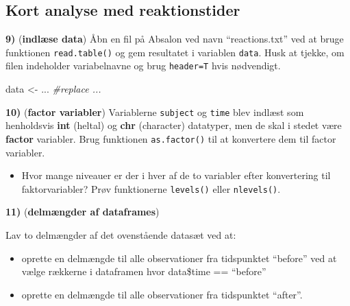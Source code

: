 \documentclass[
]{book}
\newenvironment{Shaded}{\begin{snugshade}}{\end{snugshade}}
\newcommand{\CommentTok}[1]{\textcolor[rgb]{0.56,0.35,0.01}{\textit{#1}}}
\newcommand{\DocumentationTok}[1]{\textcolor[rgb]{0.56,0.35,0.01}{\textbf{\textit{#1}}}}
\newcommand{\FunctionTok}[1]{\textcolor[rgb]{0.13,0.29,0.53}{\textbf{#1}}}
\newcommand{\NormalTok}[1]{#1}
\newcommand{\OtherTok}[1]{\textcolor[rgb]{0.56,0.35,0.01}{#1}}
\newcommand{\SpecialCharTok}[1]{\textcolor[rgb]{0.81,0.36,0.00}{\textbf{#1}}}
\providecommand{\tightlist}{%
  \setlength{\itemsep}{0pt}\setlength{\parskip}{0pt}}
\begin{document}
\subsection{Kort analyse med reaktionstider}\label{kort-analyse-med-reaktionstider}

\textbf{9)} (\textbf{indlæse data}) Åbn en fil på Absalon ved navn ``reactions.txt'' ved at bruge funktionen \texttt{read.table()} og gem resultatet i variablen \texttt{data}. Husk at tjekke, om filen indeholder variabelnavne og brug \texttt{header=T} hvis nødvendigt.

\begin{Shaded}
\begin{Highlighting}[]
\NormalTok{data }\OtherTok{\textless{}{-}}\NormalTok{ ... }\CommentTok{\#replace ...}
\end{Highlighting}
\end{Shaded}

\textbf{10)} (\textbf{factor variabler}) Variablerne \texttt{subject} og \texttt{time} blev indlæst som henholdsvis \textbf{int} (heltal) og \textbf{chr} (character) datatyper, men de skal i stedet være \textbf{factor} variabler. Brug funktionen \texttt{as.factor()} til at konvertere dem til factor variabler.

\begin{Shaded}
\end{Shaded}

\begin{itemize}
\tightlist
\item
  Hvor mange niveauer er der i hver af de to variabler efter konvertering til faktorvariabler? Prøv funktionerne \texttt{levels()} eller \texttt{nlevels()}.
\end{itemize}

\textbf{11)} (\textbf{delmængder af dataframes})

Lav to delmængder af det ovenstående datasæt ved at:

\begin{itemize}
\tightlist
\item
  oprette en delmængde til alle observationer fra tidspunktet ``before'' ved at vælge rækkerne i dataframen hvor data\$time == ``before''
\item
  oprette en delmængde til alle observationer fra tidspunktet ``after''.
\end{itemize}
\end{document}
